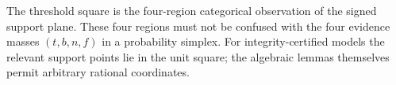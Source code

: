 The threshold square is the four-region categorical observation of the signed support plane. These four regions must not be confused with the four evidence masses \((t,b,n,f)\) in a probability simplex. For integrity-certified models the relevant support points lie in the unit square; the algebraic lemmas themselves permit arbitrary rational coordinates.
